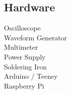 \documentclass[]{deedy-resume-openfont}
\begin{document}
\begin{minipage}[t]{0.33\textwidth}
\subsection{Hardware}
Oscilloscope\\
Waveform Generator\\
Multimeter \\
Power Supply \\
Soldering Iron \\
Arduino / Teensy\\
Raspberry Pi \\
\sectionsep



%
%

\end{minipage} 
\hfill
\end{document}
